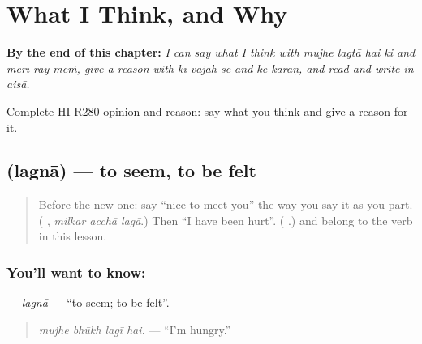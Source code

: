 
\chapter{What I Think, and Why}
\label{ch:hi-what-i-think-and-why}

\begin{chapteropening}
\textbf{By the end of this chapter:} \emph{I can say what I think with mujhe lagtā hai ki and merī rāy meṁ, give a reason with kī vajah se and ke kāraṇ, and read and write  in aisā.}

Complete HI-R280-opinion-and-reason: say what you think and give a reason for it.
\end{chapteropening}

\section[\texorpdfstring{\hi{लगना} (lagnā)}{लगना (lagnā)}]{ (lagnā) — to seem, to be felt}

\label{lesson:HI-C280-lagna}



\begin{quote}
Before the new one: say \textquotedblleft{}nice to meet you\textquotedblright{} the way you say it as you part. (\textbf{  }, \emph{milkar acchā lagā}.) Then \textquotedblleft{}I have been hurt\textquotedblright{}. (\textbf{   }.) \textbf{} and \textbf{} belong to the verb in this lesson.
\end{quote}

\subsection*{You'll want to know: }
\textbf{} — \emph{lagnā} — \textquotedblleft{}to seem; to be felt\textquotedblright{}.

\begin{quote}
\textbf{   }
\end{quote}

\begin{quote}
\emph{mujhe bhūkh lagī hai.} — \textquotedblleft{}I'm hungry.\textquotedblright{}
\end{quote}

